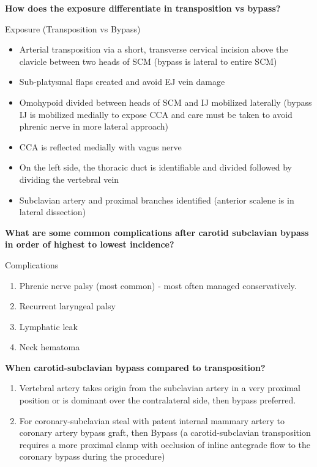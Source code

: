 \documentclass[
]{book}
\begin{document}
\textbf{How does the exposure differentiate in transposition vs bypass?}

Exposure (Transposition vs Bypass)

\begin{itemize}
\item
  Arterial transposition via a short, transverse cervical incision
  above the clavicle between two heads of SCM (bypass is lateral to
  entire SCM)
\item
  Sub-platysmal flaps created and avoid EJ vein damage
\item
  Omohypoid divided between heads of SCM and IJ mobilized laterally
  (bypass IJ is mobilized medially to expose CCA and care must be
  taken to avoid phrenic nerve in more lateral approach)
\item
  CCA is reflected medially with vagus nerve~
\item
  On the left side, the thoracic duct is identifiable and divided
  followed by dividing the vertebral vein
\item
  Subclavian artery and proximal branches identified (anterior scalene
  is in lateral dissection)
\end{itemize}

\textbf{What are some common complications after carotid subclavian bypass in
order of highest to lowest incidence?}

Complications \citep{voigtOutcomesCarotidsubclavianBypass2019}

\begin{enumerate}
\def\labelenumi{\arabic{enumi}.}
\item
  Phrenic nerve palsy (most common) - most often managed
  conservatively.
\item
  Recurrent laryngeal palsy
\item
  Lymphatic leak
\item
  Neck hematoma
\end{enumerate}

\textbf{When carotid-subclavian bypass compared to transposition?}

\begin{enumerate}
\def\labelenumi{\arabic{enumi}.}
\item
  Vertebral artery takes origin from the subclavian artery in a very
  proximal position or is dominant over the contralateral side, then
  bypass preferred. \citep{moraschTechniqueSubclavianCarotid2009d}
\item
  For coronary-subclavian steal with patent internal mammary artery to
  coronary artery bypass graft, then Bypass (a carotid-subclavian
  transposition requires a more proximal clamp with occlusion of
  inline antegrade flow to the coronary bypass during the procedure)
  \citep{cuaReviewCoronarySubclavian2017}
\end{enumerate}
\end{document}
